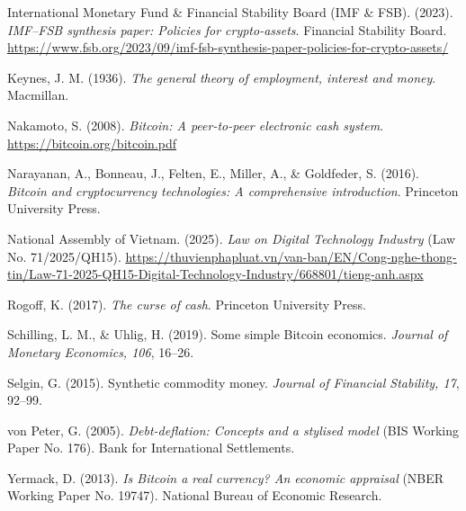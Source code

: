 \documentclass[12pt]{article}
\begin{document}
International Monetary Fund \& Financial Stability Board (IMF \& FSB). (2023). \emph{IMF--FSB synthesis paper: Policies for crypto-assets}. Financial Stability Board. \url{https://www.fsb.org/2023/09/imf-fsb-synthesis-paper-policies-for-crypto-assets/}

Keynes, J. M. (1936). \emph{The general theory of employment, interest and money}. Macmillan.

Nakamoto, S. (2008). \emph{Bitcoin: A peer-to-peer electronic cash system}. \url{https://bitcoin.org/bitcoin.pdf}

Narayanan, A., Bonneau, J., Felten, E., Miller, A., \& Goldfeder, S. (2016). \emph{Bitcoin and cryptocurrency technologies: A comprehensive introduction}. Princeton University Press.

National Assembly of Vietnam. (2025). \emph{Law on Digital Technology Industry} (Law No. 71/2025/QH15). \url{https://thuvienphapluat.vn/van-ban/EN/Cong-nghe-thong-tin/Law-71-2025-QH15-Digital-Technology-Industry/668801/tieng-anh.aspx}

Rogoff, K. (2017). \emph{The curse of cash}. Princeton University Press.

Schilling, L. M., \& Uhlig, H. (2019). Some simple Bitcoin economics. \emph{Journal of Monetary Economics, 106}, 16--26.

Selgin, G. (2015). Synthetic commodity money. \emph{Journal of Financial Stability, 17}, 92--99.

von Peter, G. (2005). \emph{Debt-deflation: Concepts and a stylised model} (BIS Working Paper No. 176). Bank for International Settlements.

Yermack, D. (2013). \emph{Is Bitcoin a real currency? An economic appraisal} (NBER Working Paper No. 19747). National Bureau of Economic Research.

\endgroup
\end{document}
